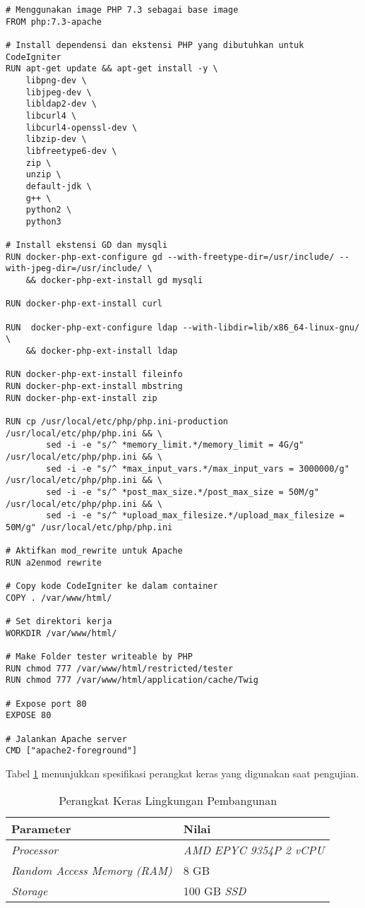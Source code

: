 \begin{lstlisting}[caption=File \textit{Dockerfile} yang digunakan, label=kode:5:3:1:dockerfile]
# Menggunakan image PHP 7.3 sebagai base image
FROM php:7.3-apache

# Install dependensi dan ekstensi PHP yang dibutuhkan untuk CodeIgniter
RUN apt-get update && apt-get install -y \
    libpng-dev \
    libjpeg-dev \
	libldap2-dev \
	libcurl4 \
    libcurl4-openssl-dev \
	libzip-dev \
    libfreetype6-dev \
    zip \
    unzip \
	default-jdk \
	g++ \
	python2 \
	python3

# Install ekstensi GD dan mysqli
RUN docker-php-ext-configure gd --with-freetype-dir=/usr/include/ --with-jpeg-dir=/usr/include/ \
    && docker-php-ext-install gd mysqli
	
RUN docker-php-ext-install curl

RUN  docker-php-ext-configure ldap --with-libdir=lib/x86_64-linux-gnu/ \
	&& docker-php-ext-install ldap

RUN docker-php-ext-install fileinfo
RUN docker-php-ext-install mbstring
RUN docker-php-ext-install zip

RUN cp /usr/local/etc/php/php.ini-production /usr/local/etc/php/php.ini && \
        sed -i -e "s/^ *memory_limit.*/memory_limit = 4G/g" /usr/local/etc/php/php.ini && \
        sed -i -e "s/^ *max_input_vars.*/max_input_vars = 3000000/g" /usr/local/etc/php/php.ini && \
        sed -i -e "s/^ *post_max_size.*/post_max_size = 50M/g" /usr/local/etc/php/php.ini && \
        sed -i -e "s/^ *upload_max_filesize.*/upload_max_filesize = 50M/g" /usr/local/etc/php/php.ini

# Aktifkan mod_rewrite untuk Apache
RUN a2enmod rewrite

# Copy kode CodeIgniter ke dalam container
COPY . /var/www/html/

# Set direktori kerja
WORKDIR /var/www/html/

# Make Folder tester writeable by PHP
RUN chmod 777 /var/www/html/restricted/tester
RUN chmod 777 /var/www/html/application/cache/Twig

# Expose port 80
EXPOSE 80

# Jalankan Apache server
CMD ["apache2-foreground"]
\end{lstlisting}

Tabel \ref{tab:5:1:keraspembangunan} menunjukkan spesifikasi perangkat keras yang digunakan saat pengujian.
\begin{table}[H]
    \caption{Perangkat Keras Lingkungan Pembangunan}
    \label{tab:5:1:keraspembangunan}
    \centering
    \begin{tabular}{|l|l|}
        \hline
        \textbf{Parameter}                  & \textbf{Nilai}              \\ \hline
        \textit{Processor}                  & \textit{AMD EPYC 9354P 2 vCPU} \\ \hline
        \textit{Random Access Memory (RAM)} & 8 GB                       \\ \hline
        \textit{Storage}                    & 100 GB \textit{SSD}           \\ \hline
    \end{tabular}
\end{table}


